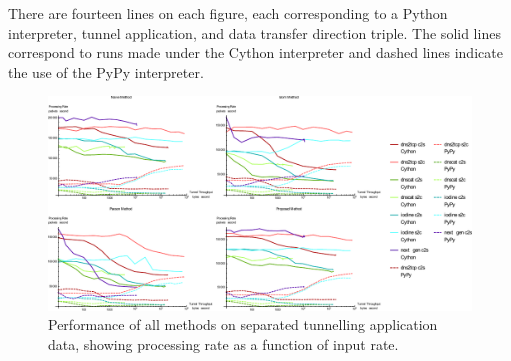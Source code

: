 \documentclass{llncs}
\begin{document}
There are fourteen lines on each figure, each corresponding to a Python
interpreter, tunnel application, and data transfer direction triple. The solid
lines correspond to runs made under the Cython interpreter and dashed lines
indicate the use of the PyPy interpreter.

\begin{figure}
\centering
\includegraphics[width=\textwidth]{../figures/ppia-all.pdf}
\caption[Performance of Alls Method on Tunnel Data by Python
Interpreter]{Performance of all methods on separated tunnelling application
data, showing processing rate as a function of input rate.}
\label{ppia-all}
\end{figure}

%
\end{document}

